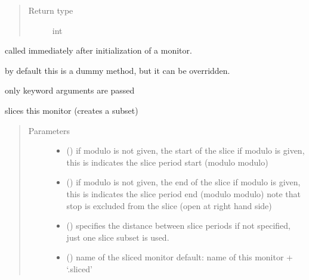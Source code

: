 \documentclass[letterpaper,10pt,english]{sphinxmanual}
\begin{document}
\begin{fulllineitems}
\begin{fulllineitems}
\begin{quote}
\begin{description}
\item[{Return type}] \leavevmode
int

\end{description}\end{quote}

\end{fulllineitems}


\begin{fulllineitems}
\label{\detokenize{Reference:salabim.Monitor.setup}}
called immediately after initialization of a monitor.

by default this is a dummy method, but it can be overridden.

only keyword arguments are passed

\end{fulllineitems}


\begin{fulllineitems}
\label{\detokenize{Reference:salabim.Monitor.slice}}
slices this monitor (creates a subset)
\begin{quote}\begin{description}
\item[{Parameters}] \leavevmode\begin{itemize}
\item {} 
 () \textendash{} if modulo is not given, the start of the slice 
if modulo is given, this is indicates the slice period start (modulo modulo)

\item {} 
 () \textendash{} if modulo is not given, the end of the slice 
if modulo is given, this is indicates the slice period end (modulo modulo) 
note that stop is excluded from the slice (open at right hand side)

\item {} 
 () \textendash{} specifies the distance between slice periods 
if not specified, just one slice subset is used.

\item {} 
 () \textendash{} name of the sliced monitor 
default: name of this monitor + ‘.sliced’


\end{itemize}
\end{description}
\end{quote}
\end{fulllineitems}
\end{fulllineitems}
\end{document}

